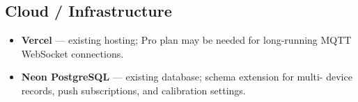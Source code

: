 \documentclass[10pt,a4paper]{article}
\begin{document}
\subsection*{Cloud / Infrastructure}
\begin{itemize}[leftmargin=1.8em, itemsep=2pt]
    \item \textbf{Vercel} --- existing hosting; Pro plan may be needed for long-running
          MQTT WebSocket connections.
    \item \textbf{Neon PostgreSQL} --- existing database; schema extension for multi-
          device records, push subscriptions, and calibration settings.
\end{itemize}
\end{document}
